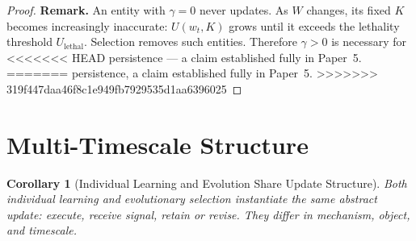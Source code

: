 \documentclass[11pt]{article}
\newtheorem{corollary}[theorem]{Corollary}
\theoremstyle{definition}
\begin{document}
\begin{proof}
\textbf{Remark.} An entity with $\gamma = 0$ never updates. As $W$
changes, its fixed $K$ becomes increasingly inaccurate: $U(w_t, K)$
grows until it exceeds the lethality threshold $U_{\mathrm{lethal}}$.
Selection removes such entities. Therefore $\gamma > 0$ is necessary for
<<<<<<< HEAD
persistence --- a claim established fully in Paper~5.
=======
persistence, a claim established fully in Paper~5.
>>>>>>> 319f447daa46f8c1e949fb7929535d1aa6396025
\end{proof}

\section{Multi-Timescale Structure}
\label{sec:multiscale}

\begin{corollary}[Individual Learning and Evolution Share Update Structure]
\label{cor:multiscale}
Both individual learning and evolutionary selection instantiate the
same abstract update: execute, receive signal, retain or revise. They
differ in mechanism, object, and timescale.
\end{corollary}
\end{document}
